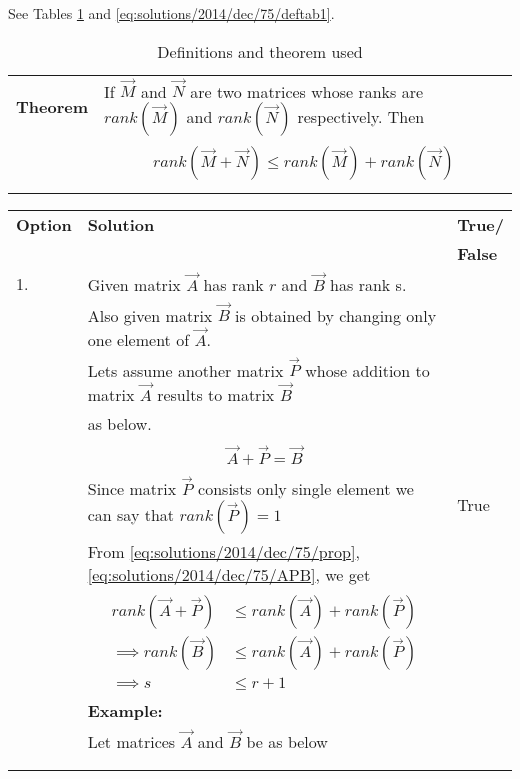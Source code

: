 See Tables \ref{eq:solutions/2014/dec/75/deftab}
 and \ref{eq:solutions/2014/dec/75/deftab1}.

\onecolumn
\begin{longtable}{|l|l|}
\hline
\endhead
\textbf{Theorem}&If $\vec{M}$ and $\vec{N}$ are two matrices whose ranks are $rank(\vec{M})$ and $rank(\vec{N})$ respectively. Then\\&\parbox{14cm}{\begin{align}
    rank(\vec{M}+\vec{N})\leq rank(\vec{M})+rank(\vec{N})\label{eq:solutions/2014/dec/75/prop}
\end{align}}\\
\hline
\caption{Definitions and theorem used}
\label{eq:solutions/2014/dec/75/deftab}
\end{longtable}

\begin{longtable}{|l|l|l|}
\hline
\endhead
\textbf{Option}&\textbf{Solution}&\textbf{True/}\\&&\textbf{False}\\
\hline
1.&Given matrix $\vec{A}$ has rank $r$ and $\vec{B}$ has rank s.&\\&Also given matrix $\vec{B}$ is obtained by changing only one element of $\vec{A}$.&\\&Lets assume another matrix $\vec{P}$ whose addition to matrix $\vec{A}$ results to matrix $\vec{B}$&\\&as below.&\\&\parbox{14cm}{\begin{align}
    \vec{A}+\vec{P}=\vec{B}\label{eq:solutions/2014/dec/75/APB}
\end{align}}&\\&Since matrix $\vec{P}$ consists only single element we can say that $rank(\vec{P})=1$&True\\&From \eqref{eq:solutions/2014/dec/75/prop}, \eqref{eq:solutions/2014/dec/75/APB}, we get&\\&\parbox{14cm}{\begin{align}
    rank(\vec{A}+\vec{P})&\leq rank(\vec{A})+rank(\vec{P})\\
    \implies rank(\vec{B})&\leq rank(\vec{A})+rank(\vec{P})\\
    \implies s&\leq r+1\label{eq:solutions/2014/dec/75/p1}
\end{align}}&\\&\textbf{Example:}&\\&Let matrices $\vec{A}$ and $\vec{B}$ be as below&\\&\parbox{14cm}{\begin{align}

\end{align}}
\end{longtable}
